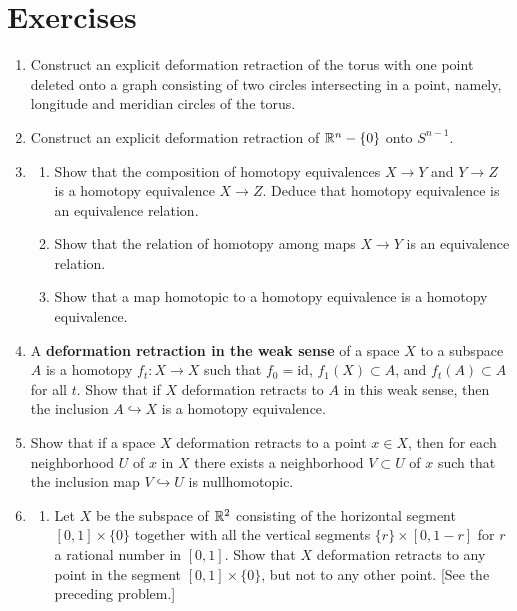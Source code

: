 \section*{Exercises}

\begin{enumerate}

\item Construct an explicit deformation retraction of the torus with one point deleted
onto a graph consisting of two circles intersecting in a point, namely, longitude and
meridian circles of the torus.

\item Construct an explicit deformation retraction of $\mathbb{R}^n - \{0\}$ onto $S^{n-1}$.

\item
\begin{enumerate}
\item[(a)] Show that the composition of homotopy equivalences $X \to Y$ and
$Y \to Z$ is a homotopy equivalence $X \to Z$. Deduce that homotopy equivalence is
an equivalence relation.
\item[(b)] Show that the relation of homotopy among maps $X \to Y$ is an
equivalence relation.
\item[(c)] Show that a map homotopic to a homotopy equivalence is a homotopy
equivalence.
\end{enumerate}

\item A \textbf{deformation retraction in the weak sense} of a space $X$ to a subspace
$A$ is a homotopy $f_t : X \to X$ such that $f_0 = \mathrm{id}$, $f_1(X) \subset A$, and
$f_t(A) \subset A$ for all $t$. Show that if $X$ deformation retracts to $A$ in this weak
sense, then the inclusion $A \hookrightarrow X$ is a homotopy equivalence.

\item Show that if a space $X$ deformation retracts to a point $x \in X$, then for each
neighborhood $U$ of $x$ in $X$ there exists a neighborhood $V \subset U$ of $x$ such
that the inclusion map $V \hookrightarrow U$ is nullhomotopic.

\item
\begin{enumerate}
\item[(a)] Let $X$ be the subspace of $\mathbb{R}^2$ consisting of the horizontal segment
$[0,1] \times \{0\}$ together with all the vertical segments $\{r\} \times [0,1-r]$ for $r$ a
rational number in $[0,1]$. Show that $X$ deformation retracts to any point in the
segment $[0,1] \times \{0\}$, but not to any other point. [See the preceding problem.]




\end{enumerate}
\end{enumerate}
